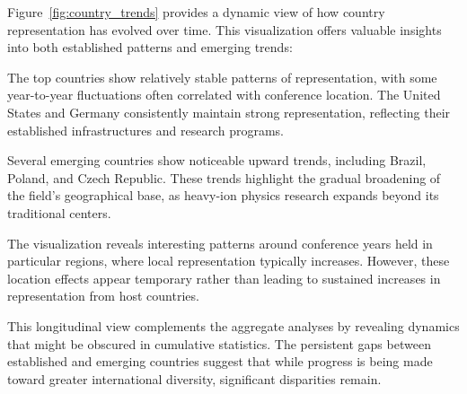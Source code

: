 \documentclass[a4paper,11pt]{article}
\begin{document}
Figure~\ref{fig:country_trends} provides a dynamic view of how country representation has evolved over time. This visualization offers valuable insights into both established patterns and emerging trends:

The top countries show relatively stable patterns of representation, with some year-to-year fluctuations often correlated with conference location. The United States and Germany consistently maintain strong representation, reflecting their established infrastructures and research programs.

Several emerging countries show noticeable upward trends, including Brazil, Poland, and Czech Republic. These trends highlight the gradual broadening of the field's geographical base, as heavy-ion physics research expands beyond its traditional centers.

The visualization reveals interesting patterns around conference years held in particular regions, where local representation typically increases. However, these location effects appear temporary rather than leading to sustained increases in representation from host countries.

This longitudinal view complements the aggregate analyses by revealing dynamics that might be obscured in cumulative statistics. The persistent gaps between established and emerging countries suggest that while progress is being made toward greater international diversity, significant disparities remain.
\end{document}
